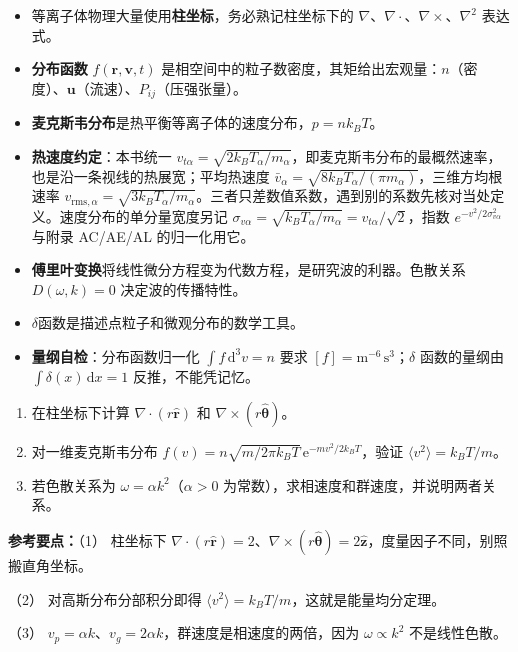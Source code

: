 \documentclass[12pt,a4paper,openany,oneside]{book}
\newcommand{\quizans}[1]{\par\medskip{\color{figGray}\rule{\linewidth}{0.3pt}}\par\smallskip
  {\footnotesize\textbf{参考要点：}#1}}
\newcommand{\ee}{\mathrm{e}}
\newcommand{\vect}[1]{\bm{#1}}
\newcommand{\unitvec}[1]{\hat{\vect{#1}}}
\newcommand{\grad}{\nabla}
\newcommand{\curl}{\nabla\times}
\newcommand{\divg}{\nabla\cdot}
\newcommand{\lap}{\nabla^2}
\begin{document}
\begin{chapterreview}
\begin{itemize}
\item 等离子体物理大量使用\textbf{柱坐标}，务必熟记柱坐标下的 $\grad$、$\divg$、$\curl$、$\lap$ 表达式。
\item \textbf{分布函数} $f(\vect{r},\vect{v},t)$ 是相空间中的粒子数密度，其矩给出宏观量：$n$（密度）、$\vect{u}$（流速）、$P_{ij}$（压强张量）。
\item \textbf{麦克斯韦分布}是热平衡等离子体的速度分布，$p=nk_BT$。
\item \textbf{热速度约定}：本书统一 $v_{t\alpha}=\sqrt{2k_BT_\alpha/m_\alpha}$，即麦克斯韦分布的最概然速率，也是沿一条视线的热展宽；平均热速度 $\bar{v}_\alpha=\sqrt{8k_BT_\alpha/(\pi m_\alpha)}$，三维方均根速率 $v_{\mathrm{rms},\alpha}=\sqrt{3k_BT_\alpha/m_\alpha}$。三者只差数值系数，遇到别的系数先核对当处定义。速度分布的单分量宽度另记 $\sigma_{v\alpha}=\sqrt{k_BT_\alpha/m_\alpha}=v_{t\alpha}/\sqrt2$，指数 $e^{-v^2/2\sigma_{v\alpha}^2}$ 与附录 AC/AE/AL 的归一化用它。
\item \textbf{傅里叶变换}将线性微分方程变为代数方程，是研究波的利器。色散关系 $D(\omega,k)=0$ 决定波的传播特性。
\item $\delta$函数是描述点粒子和微观分布的数学工具。
\item \textbf{量纲自检}：分布函数归一化 $\int f\,\mathrm{d}^3v=n$ 要求 $[f]=\mathrm{m^{-6}\,s^{3}}$；$\delta$ 函数的量纲由 $\int\delta(x)\,\mathrm{d}x=1$ 反推，不能凭记忆。
\end{itemize}
\end{chapterreview}

\begin{miniquiz}
\begin{enumerate}
\item 在柱坐标下计算 $\divg(r\unitvec{r})$ 和 $\curl(r\unitvec{\theta})$。
\item 对一维麦克斯韦分布 $f(v) = n\sqrt{m/2\pi k_BT}\,\ee^{-mv^2/2k_BT}$，验证 $\langle v^2 \rangle = k_BT/m$。
\item 若色散关系为 $\omega = \alpha k^2$（$\alpha>0$ 为常数），求相速度和群速度，并说明两者关系。
\end{enumerate}
\quizans{（1） 柱坐标下 $\divg(r\unitvec r)=2$、$\curl(r\unitvec\theta)=2\unitvec z$，度量因子不同，别照搬直角坐标。\par （2） 对高斯分布分部积分即得 $\langle v^2\rangle=k_BT/m$，这就是能量均分定理。\par （3） $v_p=\alpha k$、$v_g=2\alpha k$，群速度是相速度的两倍，因为 $\omega\propto k^2$ 不是线性色散。}
\end{miniquiz}
\end{document}

